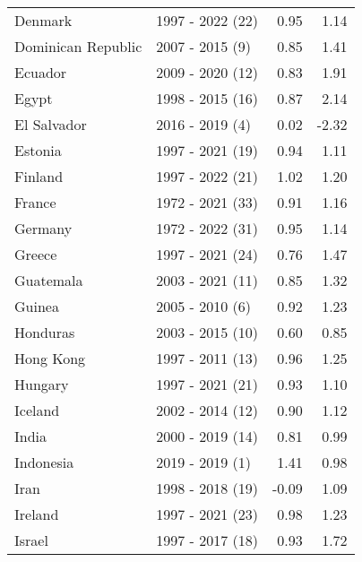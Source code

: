 \begin{table}[H]
{{\begin{tabular}{llrr}
\addlinespace
Denmark & 1997 - 2022 (22) & 0.95 & 1.14\\
Dominican Republic & 2007 - 2015 (9) & 0.85 & 1.41\\
Ecuador & 2009 - 2020 (12) & 0.83 & 1.91\\
Egypt & 1998 - 2015 (16) & 0.87 & 2.14\\
El Salvador & 2016 - 2019 (4) & 0.02 & -2.32\\
\addlinespace
Estonia & 1997 - 2021 (19) & 0.94 & 1.11\\
Finland & 1997 - 2022 (21) & 1.02 & 1.20\\
France & 1972 - 2021 (33) & 0.91 & 1.16\\
Germany & 1972 - 2022 (31) & 0.95 & 1.14\\
Greece & 1997 - 2021 (24) & 0.76 & 1.47\\
\addlinespace
Guatemala & 2003 - 2021 (11) & 0.85 & 1.32\\
Guinea & 2005 - 2010 (6) & 0.92 & 1.23\\
Honduras & 2003 - 2015 (10) & 0.60 & 0.85\\
Hong Kong & 1997 - 2011 (13) & 0.96 & 1.25\\
Hungary & 1997 - 2021 (21) & 0.93 & 1.10\\
\addlinespace
Iceland & 2002 - 2014 (12) & 0.90 & 1.12\\
India & 2000 - 2019 (14) & 0.81 & 0.99\\
Indonesia & 2019 - 2019 (1) & 1.41 & 0.98\\
Iran & 1998 - 2018 (19) & -0.09 & 1.09\\
Ireland & 1997 - 2021 (23) & 0.98 & 1.23\\
\addlinespace
Israel & 1997 - 2017 (18) & 0.93 & 1.72\\
\bottomrule
\end{tabular}
}

}
\end{table}

